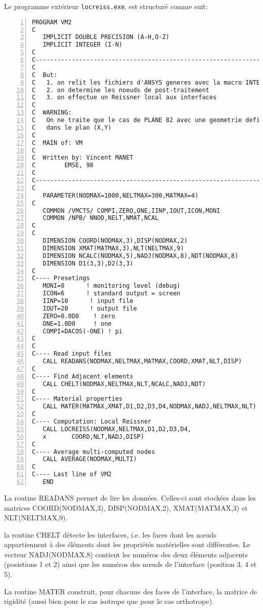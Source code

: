 Le programme extérieur \verb|locreiss.exe|, est structuré comme suit:

\color{gris}\scriptsize
\begin{Verbatim}[numbers=left,numbersep=3pt]
   PROGRAM VM2
C
   IMPLICIT DOUBLE PRECISION (A-H,O-Z)
   IMPLICIT INTEGER (I-N)
C
C--------------------------------------------------------------------------
C
C  But:
C   1. on relit les fichiers d'ANSYS generes avec la macro INTERF
C   2. on determine les noeuds de post-traitement
C   3. on effectue un Reissner local aux interfaces
C
C  WARNING:
C   On ne traite que le cas de PLANE 82 avec une geometrie definie
C   dans le plan (X,Y)
C
C  MAIN of: VM
C
C  Written by: Vincent MANET
C        EMSE, 98
C
C----------------------------------------------------------------------------
C
   PARAMETER(NODMAX=1000,NELTMAX=300,MATMAX=4)
C
   COMMON /VMCTS/ COMPI,ZERO,ONE,IINP,IOUT,ICON,MONI
   COMMON /NPB/ NNOD,NELT,NMAT,NCAL
C
C
   DIMENSION COORD(NODMAX,3),DISP(NODMAX,2)
   DIMENSION XMAT(MATMAX,3),NLT(NELTMAX,9)
   DIMENSION NCALC(NODMAX,5),NADJ(NODMAX,8),NDT(NODMAX,8)
   DIMENSION D1(3,3),D2(3,3)
C
C---- Presetings
   MONI=0      ! monitoring level (debug)
   ICON=6      ! standard output = screen
   IINP=10      ! input file
   IOUT=20      ! output file
   ZERO=0.0D0    ! zero
   ONE=1.0D0     ! one
   COMPI=DACOS(-ONE) ! pi
C
C
C---- Read input files
   CALL READANS(NODMAX,NELTMAX,MATMAX,COORD,XMAT,NLT,DISP)
C
C---- Find Adjacent elements
   CALL CHELT(NODMAX,NELTMAX,NLT,NCALC,NADJ,NDT)
C
C---- Material properties
   CALL MATER(MATMAX,XMAT,D1,D2,D3,D4,NODMAX,NADJ,NELTMAX,NLT)
C
C---- Computation: Local Reissner
   CALL LOCREISS(NODMAX,NELTMAX,D1,D2,D3,D4,
   x       COORD,NLT,NADJ,DISP)
C
C---- Average multi-computed nodes
   CALL AVERAGE(NODMAX,MULTI)
C
C---- Last line of VM2
   END
\end{Verbatim}
\color{black}\normalsize

\medskip
La routine READANS permet de lire les données. Celles-ci sont stockées dans les matrices
COORD(NODMAX,3), DISP(NODMAX,2), XMAT(MATMAX,3) et NLT(NELTMAX,9).

\medskip
la routine CHELT détecte les interfaces, i.e. les faces dont les nœuds appartiennent à des éléments dont les propriétés
matérielles sont différentes.
Le vecteur NADJ(NODMAX,8) contient les numéros des deux éléments adjacents (posistions 1 et 2) ainsi que les
numéros des nœuds de l'interface (position 3, 4 et 5).

\medskip
La routine MATER construit, pour chacune des faces de l'interface, la matrice de rigidité (aussi bien pour le cas isotrope
que pour le cas orthotrope).

